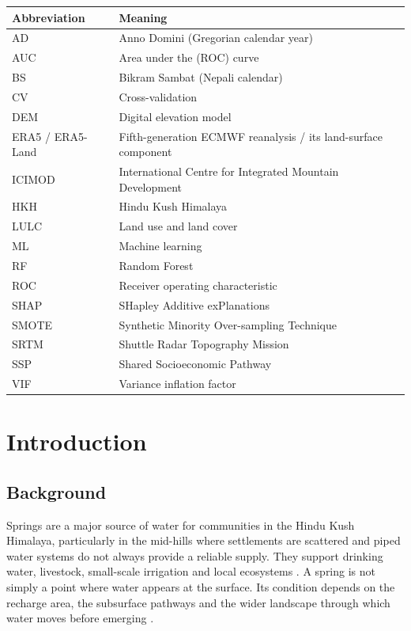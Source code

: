 \documentclass[12pt,a4paper]{article}
\begin{document}
{\small
\begin{tabularx}{\linewidth}{LL}
\toprule
\textbf{Abbreviation} & \textbf{Meaning} \\
\midrule
AD & Anno Domini (Gregorian calendar year) \\
AUC & Area under the (ROC) curve \\
BS & Bikram Sambat (Nepali calendar) \\
CV & Cross-validation \\
DEM & Digital elevation model \\
ERA5 / ERA5-Land & Fifth-generation ECMWF reanalysis / its land-surface component \\
ICIMOD & International Centre for Integrated Mountain Development \\
HKH & Hindu Kush Himalaya \\
LULC & Land use and land cover \\
ML & Machine learning \\
RF & Random Forest \\
ROC & Receiver operating characteristic \\
SHAP & SHapley Additive exPlanations \\
SMOTE & Synthetic Minority Over-sampling Technique \\
SRTM & Shuttle Radar Topography Mission \\
SSP & Shared Socioeconomic Pathway \\
VIF & Variance inflation factor \\
\bottomrule
\end{tabularx}
}

\clearpage
{}

\clearpage
\section{Introduction}\label{sec:intro}

\subsection{Background}\label{sec:background}

Springs are a major source of water for communities in the Hindu Kush Himalaya, particularly in the mid-hills where settlements are scattered and piped water systems do not always provide a reliable supply. They support drinking water, livestock, small-scale irrigation and local ecosystems \citep{icimod2009,tambe2012,agrawal2023}. A spring is not simply a point where water appears at the surface. Its condition depends on the recharge area, the subsurface pathways and the wider landscape through which water moves before emerging \citep{chinnasamy2016}.
\end{document}
